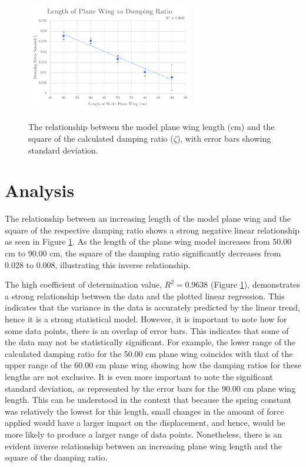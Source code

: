 \documentclass[12pt]{article}
\begin{document}
\begin{figure}[H]
    \centering
    \caption{The relationship between the model plane wing length (cm) and the square of the calculated damping ratio ($\zeta$), with error bars showing standard deviation.}
    \includegraphics[width=0.65\textwidth]{images/graph.png}
    \label{fig:processed graph}
\end{figure}

\vspace{-10mm}

\section{Analysis}

The relationship between an increasing length of the model plane wing and the square of the respective damping ratio shows a strong negative linear relationship as seen in Figure \ref{fig:processed graph}. As the length of the plane wing model increases from 50.00 cm to 90.00 cm, the square of the damping ratio significantly decreases from 0.028 to 0.008, illustrating this inverse relationship. 

The high coefficient of determination value, $R^2 = 0.9638$ (Figure \ref{fig:processed graph}), demonstrates a strong relationship between the data and the plotted linear regression. This indicates that the variance in the data is accurately predicted by the linear trend, hence it is a strong statistical model. However, it is important to note how for some data points, there is an overlap of error bars. This indicates that some of the data may not be statistically significant. For example, the lower range of the calculated damping ratio for the 50.00 cm plane wing coincides with that of the upper range of the 60.00 cm plane wing showing how the damping ratios for these lengths are not exclusive. It is even more important to note the significant standard deviation, as represented by the error bars for the 90.00 cm plane wing length. This can be understood in the context that because the spring constant was relatively the lowest for this length, small changes in the amount of force applied would have a larger impact on the displacement, and hence, would be more likely to produce a larger range of data points. Nonetheless, there is an evident inverse relationship between an increasing plane wing length and the square of the damping ratio. 
\end{document}

